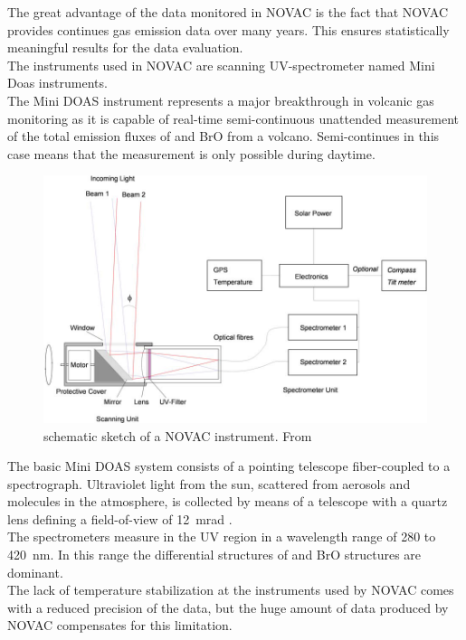 		The great advantage of the data monitored in NOVAC is the fact that NOVAC provides continues gas emission data over many years. This ensures statistically meaningful results for the data evaluation.\\
		The instruments used in NOVAC are scanning UV-spectrometer named Mini Doas instruments. \\
		The  Mini DOAS  instrument  represents  a  major  breakthrough  in  volcanic  gas	monitoring as it is capable of real-time semi-continuous unattended measurement of the total emission fluxes of   and BrO from a volcano. Semi-continues in this case means that the measurement is only possible during daytime.\\
		\begin{figure}
			\centering
		 \includegraphics[width=1\textwidth]{Bilder/Simon/Bilder_Tung/NOVAC_Instrument}
			\caption{schematic sketch of a NOVAC instrument. From \cite{galle2010network}}
		\end{figure}
		The  basic  Mini DOAS  system  consists  of  a  pointing  telescope  fiber-coupled  to  a  spectrograph.  
		Ultraviolet light from the sun, scattered from aerosols and molecules in the atmosphere, is collected by 
		means  of  a  telescope  with  a  quartz  lens  defining  a  field-of-view  of  12~mrad
		\citep{NOVACsite}. \\
		The spectrometers measure in the UV region in a wavelength range of 280 to 420~nm. In this range the differential structures of  and BrO structures are dominant.\\
		The lack of temperature stabilization at the instruments used by NOVAC comes with a reduced precision of the data, but the huge amount of data produced by NOVAC compensates for this limitation.  
		
